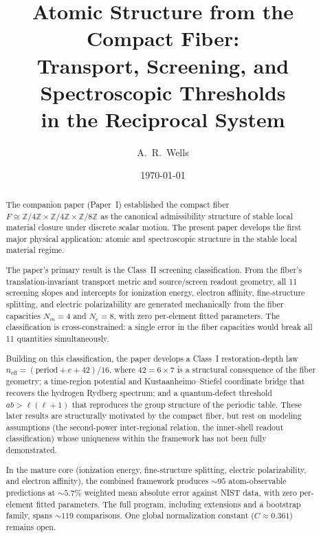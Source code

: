 \documentclass[11pt,a4paper]{article}
\title{Atomic Structure from the Compact Fiber:\\
Transport, Screening, and Spectroscopic Thresholds\\
in the Reciprocal System}
\author{A.\ R.\ Wells}
\affil{Dual-Frame Research Group}
\date{\today}
\begin{document}
\maketitle

\begin{abstract}
The companion paper (Paper~I) established the compact fiber $F \cong \mathbb{Z}/4\mathbb{Z} \times \mathbb{Z}/4\mathbb{Z} \times \mathbb{Z}/8\mathbb{Z}$ as the canonical admissibility structure of stable local material closure under discrete scalar motion.
The present paper develops the first major physical application: atomic and spectroscopic structure in the stable local material regime.

The paper's primary result is the Class~II screening classification. From the fiber's translation-invariant transport metric and source/screen readout geometry, all 11 screening slopes and intercepts for ionization energy, electron affinity, fine-structure splitting, and electric polarizability are generated mechanically from the fiber capacities $N_m = 4$ and $N_e = 8$, with zero per-element fitted parameters. The classification is cross-constrained: a single error in the fiber capacities would break all 11 quantities simultaneously.

Building on this classification, the paper develops a Class~I restoration-depth law $n_{\mathrm{eff}} = (\mathrm{period} + e + 42)/16$, where $42 = 6 \times 7$ is a structural consequence of the fiber geometry; a time-region potential and Kustaanheimo--Stiefel coordinate bridge that recovers the hydrogen Rydberg spectrum; and a quantum-defect threshold $ab > \ell(\ell+1)$ that reproduces the group structure of the periodic table. These later results are structurally motivated by the compact fiber, but rest on modeling assumptions (the second-power inter-regional relation, the inner-shell readout classification) whose uniqueness within the framework has not been fully demonstrated.

In the mature core (ionization energy, fine-structure splitting, electric polarizability, and electron affinity), the combined framework produces ${\sim}95$ atom-observable predictions at ${\sim}5.7\%$ weighted mean absolute error against NIST data, with zero per-element fitted parameters.
The full program, including extensions and a bootstrap family, spans ${\sim}119$ comparisons.
One global normalization constant ($C \approx 0.361$) remains open.
\end{abstract}

\tableofcontents
\newpage
\end{document}

